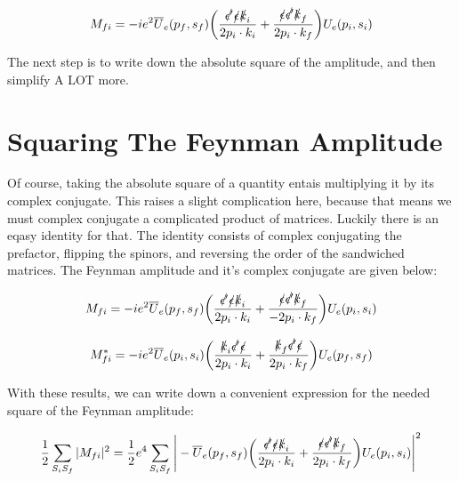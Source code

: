 \documentclass[a4]{article}
\begin{document}
    \begin{equation}
        M_{fi} = - i e^2 \overline{U}_e (p_f, s_f) \bigg(\frac{\slashed{\epsilon'} \slashed{\epsilon} \slashed{k}_i}{2 p_i \cdot k_i} + \frac{\slashed{\epsilon} \slashed{\epsilon'} \slashed{k}_f}{2 p_i \cdot k_f} \bigg) U_e (p_i, s_i)
    \end{equation}

    The next step is to write down the absolute square of the amplitude, and then simplify A LOT more.

    \section*{Squaring The Feynman Amplitude}

    Of course, taking the absolute square of a quantity entais multiplying it by its complex conjugate. This raises a slight complication here, because that means we must complex conjugate a complicated product of matrices.
    Luckily there is an eqasy identity for that. The identity consists of complex conjugating the prefactor, flipping the spinors, and reversing the order of the sandwiched matrices. The Feynman amplitude and it's complex
    conjugate are given below:

    \begin{equation}
        M_{fi} = - i e^2 \overline{U}_e (p_f, s_f) \bigg(\frac{\slashed{\epsilon'} \slashed{\epsilon} \slashed{k}_i}{2 p_i \cdot k_i} + \frac{\slashed{\epsilon} \slashed{\epsilon'} \slashed{k}_f}{- 2 p_i \cdot k_f} \bigg) U_e (p_i, s_i)
    \end{equation}

    \begin{equation}
        M_{fi}^* = - i e^2 \overline{U}_e (p_i, s_i) \bigg(\frac{\slashed{k}_i \slashed{\epsilon'} \slashed{\epsilon}}{2 p_i \cdot k_i} + \frac{\slashed{k}_f \slashed{\epsilon'} \slashed{\epsilon}}{2 p_i \cdot k_f} \bigg) U_e (p_f, s_f)
    \end{equation}

    With these results, we can write down a convenient expression for the needed square of the Feynman amplitude:

    \begin{equation}
        \frac{1}{2} \sum_{S_i S_f} |M_{fi}|^2 = \frac{1}{2} e^4 \sum_{S_i S_f} \Bigg|- \overline{U}_e (p_f, s_f) \bigg(\frac{\slashed{\epsilon'} \slashed{\epsilon} \slashed{k}_i}{2 p_i \cdot k_i} + \frac{\slashed{\epsilon} \slashed{\epsilon'} \slashed{k}_f}{2 p_i \cdot k_f} \bigg) U_e (p_i, s_i) \Bigg|^2
    \end{equation}
\end{document}

